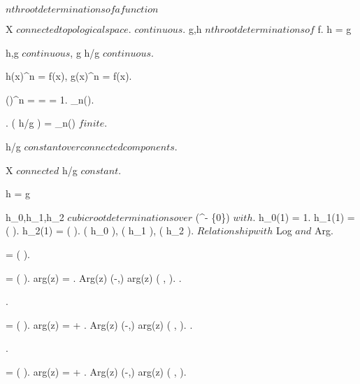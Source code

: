 \documentclass[12pt]{book}
\begin{document}
{

\unit{ $ nth root determinations of a function $ }
{
	\laboratory
	\baselineskip=30pt

	{
		{
			X $ connected topological space $.
			 $ continuous $.
			g,h $ nth root determinations of $ f.
		}
		\holds
		{
			{
				h = \zeta g
			}
		}
		\demonstration
		{
			h,g $ continuous $, g  \imp h/g $ continuous $.

			{
				h(x)^n = f(x), \s g(x)^n = f(x).

				\left(\right)^n =  =   = 1.
				 \in \mu_n(\C).
			}.
			\im( h/g ) = \mu_n(\C) $ finite $.

			h/g $ constant over connected components $.

			X $ connected $ \imp h/g $ constant $.

			{
				h = \zeta g
			}
		}

		
	}
	{
		{
			h_0,h_1,h_2 $ cubic root determinations over $ \C \setminus (\R^- \times \{0\}) $ with $.
			h_0(1) = 1.
			h_1(1) = \exp(  ).
			h_2(1) = \exp(  ).
		}
		\study
		{
			\im( h_0 ), \im( h_1 ), \im( h_2 ).
			$Relationship with $ Log $ and $ Arg.
		}
		\demonstration
		{
			{
				 = \exp(  ).

				{
					 = \exp(  ).
					arg(z) = .
					Arg(z) \in (-\pi,\pi) \imp arg(z) \in ( , ).
				}.

				.

				{
					 = \exp(  ).
					arg(z) =  + .
					Arg(z) \in (-\pi,\pi) \imp arg(z) \in ( ,  \pi  ).
				}.

				.

				{
					 = \exp(  ).
					arg(z) =  + .
					Arg(z) \in (-\pi,\pi) \imp arg(z) \in ( \pi, \frac{ 5\pi }{ 3 } ).
				}

}}}}}
\end{document}
